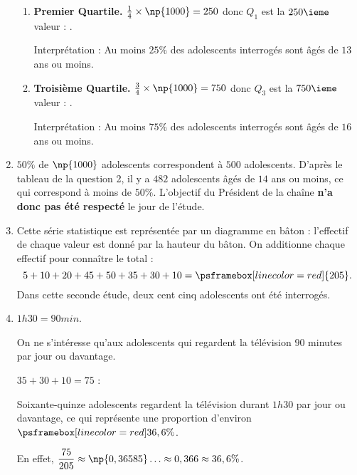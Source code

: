 \documentclass[10pt,french]{article}
\newcommand\Resultat[1]{\psframebox[linecolor=red]{#1}}
\newcommand\x{\times}
\begin{document}
\begin{enumerate}
\begin{enumerate}
            \item \textbf{Premier Quartile.} $\frac 1 4 \x \np{1000} = 250$ donc $Q_1$ est la $250\ieme$ valeur : \Resultat{$Q_1 = 13$}.\par
                Interprétation : Au moins $25\%$ des adolescents interrogés sont âgés de $13$ ans ou moins.\medskip

            \item \textbf{Troisième Quartile.} $\frac 3 4 \x \np{1000} = 750$ donc $Q_3$ est la $750\ieme$ valeur : \Resultat{$Q_3 = 16$}.\par
                Interprétation : Au moins $75\%$ des adolescents interrogés sont âgés de $16$ ans ou moins.\medskip
        \end{enumerate}\medskip

    \item $50\%$ de $\np{1000}$ adolescents correspondent à $500$ adolescents. D'après le tableau de la question 2, il y a $482$ adolescents âgés de $14$ ans ou moins, ce qui correspond à moins de $50\%$. L'objectif du Président de la chaîne \textbf{n'a donc pas été respecté} le jour de l'étude.\medskip

    \item Cette série statistique est représentée par un diagramme en bâton : l'effectif de chaque valeur est donné par la hauteur du bâton. On additionne chaque effectif pour connaître le total :
        \[5 + 10 + 20 + 45 + 50 + 35 + 30 + 10 = \Resultat{205}.\]
        Dans cette seconde étude, deux cent cinq adolescents ont été interrogés.\medskip

    \item $1h30 = 90min$.\par
        On ne s'intéresse qu'aux adolescents qui regardent la télévision $90$ minutes par jour ou davantage.\par
        $35 + 30 + 10 = 75$ :\par
        Soixante-quinze adolescents regardent la télévision durant $1h30$ par jour ou davantage, ce qui représente une proportion d'environ $\Resultat{36,6\%}$.\par
        En effet, $\dfrac{75}{205} \approx \np{0,36585}\ldots \approx 0,366 \approx 36,6\%$.
\end{enumerate}
\end{document}
